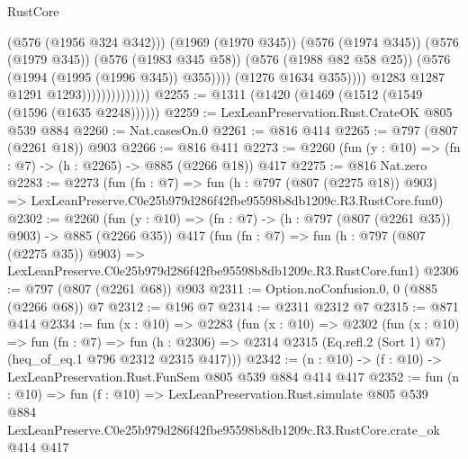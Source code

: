 \begin{lexlean}{RustCore}
\begin{coremodule}
                                            (@576 (@1956 @324 @342)))
                                          (@1969 (@1970 @345))
                                          (@576 (@1974 @345))
                                          (@576 (@1979 @345))
                                          (@576 (@1983 @345 @58))
                                          (@576 (@1988 @82 @58 @25))
                                          (@576 (@1994 (@1995 (@1996 @345)) @355))))
                                      (@1276 @1634 @355))))
                                @1283
                                @1287
                                @1291
                                @1293))))))))))))))
@2255 := @1311 (@1420 (@1469 (@1512 (@1549 (@1596 (@1635 @2248))))))
@2259 := LexLeanPreservation.Rust.CrateOK @805 @539 @884
@2260 := Nat.casesOn.{0}
@2261 := @816 @414
@2265 := @797 (@807 (@2261 @18)) @903
@2266 := @816 @411
@2273 := @2260 (fun (y : @10) => (fn : @7) -> (h : @2265) -> @885 (@2266 @18)) @417
@2275 := @816 Nat.zero
@2283 := @2273
    (fun (fn : @7) =>
    fun (h : @797 (@807 (@2275 @18)) @903) =>
    LexLeanPreserve.C0e25b979d286f42fbe95598b8db1209c.R3.RustCore.fun0)
@2302 := @2260
    (fun (y : @10) => (fn : @7) -> (h : @797 (@807 (@2261 @35)) @903) -> @885 (@2266 @35))
    @417
    (fun (fn : @7) =>
    fun (h : @797 (@807 (@2275 @35)) @903) =>
    LexLeanPreserve.C0e25b979d286f42fbe95598b8db1209c.R3.RustCore.fun1)
@2306 := @797 (@807 (@2261 @68)) @903
@2311 := Option.noConfusion.{0, 0} (@885 (@2266 @68)) @7
@2312 := @196 @7
@2314 := @2311 @2312 @7
@2315 := @871 @414
@2334 := fun (x : @10) =>
  @2283
    (fun (x : @10) =>
    @2302
      (fun (x : @10) =>
      fun (fn : @7) =>
      fun (h : @2306) =>
      @2314 @2315 (Eq.refl.{2} (Sort 1) @7) (heq_of_eq.{1} @796 @2312 @2315 @417)))
@2342 := (n : @10) -> (f : @10) -> LexLeanPreservation.Rust.FunSem @805 @539 @884 @414 @417
@2352 := fun (n : @10) =>
  fun (f : @10) =>
  LexLeanPreservation.Rust.simulate
    @805
    @539
    @884
    LexLeanPreserve.C0e25b979d286f42fbe95598b8db1209c.R3.RustCore.crate_ok
    @414
    @417
\end{coremodule}
\end{lexlean}
